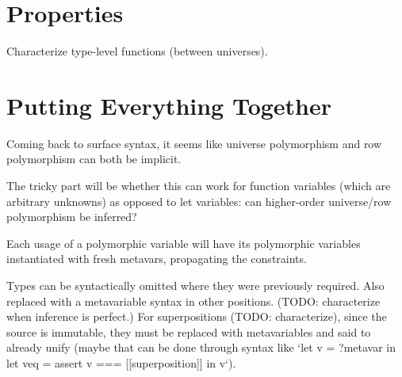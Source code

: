 \documentclass[11pt, twoside, reqno]{book}
\begin{document}
\chapter{Properties}

Characterize type-level functions (between universes).



\chapter{Putting Everything Together}
Coming back to surface syntax, it seems like universe polymorphism and row polymorphism can both be implicit.

The tricky part will be whether this can work for function variables (which are arbitrary unknowns) as opposed to let variables: can higher-order universe/row polymorphism be inferred?

Each usage of a polymorphic variable will have its polymorphic variables instantiated with fresh metavars, propagating the constraints.

Types can be syntactically omitted where they were previously required.
Also replaced with a metavariable syntax in other positions.
(TODO: characterize when inference is perfect.)
For superpositions (TODO: characterize), since the source is immutable, they must be replaced with metavariables and said to already unify (maybe that can be done through syntax like \inHS`let v = ?metavar in let veq = assert v === [[superposition]] in v`).


\iffalse
\begin{appdices}
\end{appdices}


\begin{bibliog}
\end{bibliog}
\fi
\end{document}

